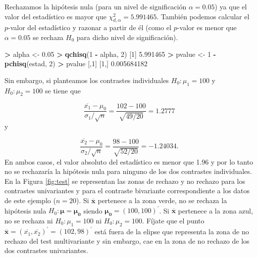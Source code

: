 \documentclass[
  a4paper,
  oneside]{scrbook}
\newenvironment{Shaded}{\begin{snugshade}}{\end{snugshade}}
\newcommand{\DecValTok}[1]{\textcolor[rgb]{0.00,0.00,0.81}{#1}}
\newcommand{\FloatTok}[1]{\textcolor[rgb]{0.00,0.00,0.81}{#1}}
\newcommand{\FunctionTok}[1]{\textcolor[rgb]{0.13,0.29,0.53}{\textbf{#1}}}
\newcommand{\NormalTok}[1]{#1}
\newcommand{\OtherTok}[1]{\textcolor[rgb]{0.56,0.35,0.01}{#1}}
\newcommand{\SpecialCharTok}[1]{\textcolor[rgb]{0.81,0.36,0.00}{\textbf{#1}}}
\theoremstyle{definition}
\theoremstyle{definition}
\theoremstyle{definition}
\theoremstyle{definition}
\theoremstyle{remark}
\begin{document}
\normalsize

Rechazamos la hipótesis nula (para un nivel de significación
\(\alpha=0.05\)) ya que el valor del estadístico es mayor que
\(\chi_{d,\alpha}^2=5.991465\). También podemos calcular el \(p\)-valor del
estadístico y razonar a partir de él (como el \(p\)-valor es menor que
\(\alpha=0.05\) se rechaza \(H_0\) para dicho nivel de significación).

\footnotesize

\begin{Shaded}
\begin{Highlighting}[]
\SpecialCharTok{\textgreater{}}\NormalTok{ alpha }\OtherTok{\textless{}{-}} \FloatTok{0.05}
\SpecialCharTok{\textgreater{}} \FunctionTok{qchisq}\NormalTok{(}\DecValTok{1} \SpecialCharTok{{-}}\NormalTok{ alpha, }\DecValTok{2}\NormalTok{)}
\NormalTok{[}\DecValTok{1}\NormalTok{] }\FloatTok{5.991465}
\SpecialCharTok{\textgreater{}}\NormalTok{ pvalue }\OtherTok{\textless{}{-}} \DecValTok{1} \SpecialCharTok{{-}} \FunctionTok{pchisq}\NormalTok{(estad, }\DecValTok{2}\NormalTok{)}
\SpecialCharTok{\textgreater{}}\NormalTok{ pvalue}
\NormalTok{            [,}\DecValTok{1}\NormalTok{]}
\NormalTok{[}\DecValTok{1}\NormalTok{,] }\FloatTok{0.005684182}
\end{Highlighting}
\end{Shaded}

\normalsize

Sin embargo, si planteamos los contrastes individuales \(H_0:\mu_1=100\) y
\(H_0:\mu_2=100\) se tiene que

\[\frac{\overline{x_1}-\mu_0}{\sigma_1/\sqrt{n}}=\frac{102-100}{\sqrt{49/20}}=1.2777\]
y

\[\frac{\overline{x_2}-\mu_0}{\sigma_2/\sqrt{n}}=\frac{98-100}{\sqrt{52/20}}= -1.24034.\]
En ambos casos, el valor absoluto del estadístico es menor que 1.96 y
por lo tanto no se rechazaría la hipótesis nula para ninguno de los dos
contrastes individuales. En la Figura
\ref{fig:test} se representan
las zonas de rechazo y no rechazo para los contrastes univariantes y
para el contraste bivariante correspondiente a los datos de este ejemplo
(\(n=20\)). Si \(\overline{\bm{x}}\) pertenece a la zona verde, no se
rechaza la hipótesis nula \(H_0:\bm\mu=\bm{\mu_0}\) siendo
\(\bm{\mu_0}=(100,100)^\prime\). Si \(\overline{\bm{x}}\) pertenece a la
zona azul, no se rechaza ni \(H_0:\mu_1=100\) ni \(H_0:\mu_2=100\). Fíjate
que el punto
\(\overline{\bm{x}}=(\overline{x_1},\overline{x_2})^\prime{}=(102,98)^\prime{}\)
está fuera de la elipse que representa la zona de no rechazo del test
multivariante y sin embargo, cae en la zona de no rechazo de los dos
contrastes univariantes.
\end{document}

